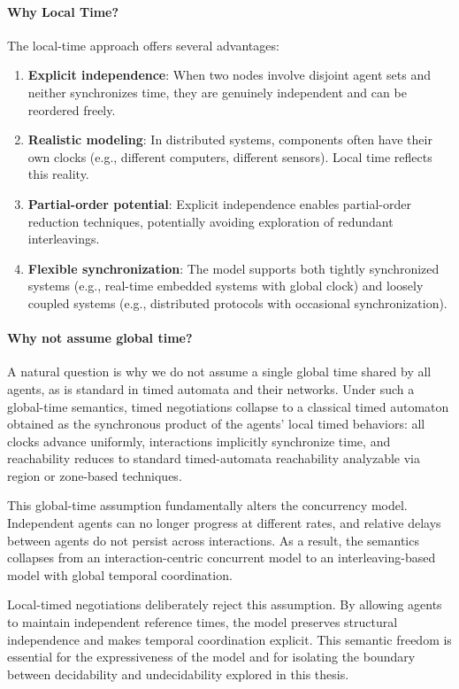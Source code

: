 \paragraph{Why Local Time?} The local-time approach offers several advantages:
\begin{enumerate}
\item \textbf{Explicit independence}: When two nodes involve disjoint agent sets and neither synchronizes time, they are genuinely independent and can be reordered freely.
\item \textbf{Realistic modeling}: In distributed systems, components often have their own clocks (e.g., different computers, different sensors). Local time reflects this reality.
\item \textbf{Partial-order potential}: Explicit independence enables partial-order reduction techniques, potentially avoiding exploration of redundant interleavings.
\item \textbf{Flexible synchronization}: The model supports both tightly synchronized systems (e.g., real-time embedded systems with global clock) and loosely coupled systems (e.g., distributed protocols with occasional synchronization).
\end{enumerate}

\paragraph{Why not assume global time?}
A natural question is why we do not assume a single global time shared by all
agents, as is standard in timed automata and their networks. Under such a
global-time semantics, timed negotiations collapse to a classical timed automaton
obtained as the synchronous product of the agents’ local timed behaviors: all
clocks advance uniformly, interactions implicitly synchronize time, and
reachability reduces to standard timed-automata reachability analyzable via region
or zone-based techniques.

This global-time assumption fundamentally alters the concurrency model. Independent
agents can no longer progress at different rates, and relative delays between
agents do not persist across interactions. As a result, the semantics collapses
from an interaction-centric concurrent model to an interleaving-based model with
global temporal coordination.

Local-timed negotiations deliberately reject this assumption. By allowing agents
to maintain independent reference times, the model preserves structural
independence and makes temporal coordination explicit. This semantic freedom is
essential for the expressiveness of the model and for isolating the boundary
between decidability and undecidability explored in this thesis.

